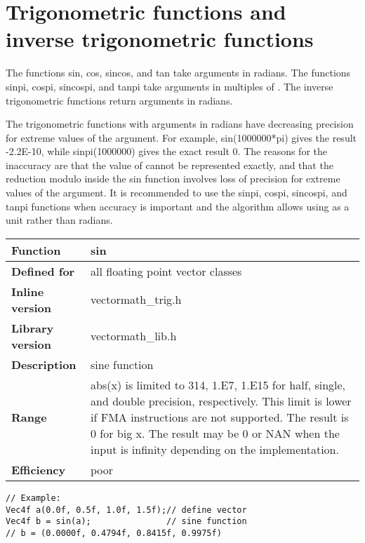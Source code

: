 \documentclass[vcl_manual.tex]{subfiles}
\begin{document}


\section{Trigonometric functions and inverse trigonometric functions}
The functions sin, cos, sincos, and tan take arguments in radians. The functions sinpi, cospi, sincospi, and tanpi take arguments in multiples of \pi{}. The inverse trigonometric functions return arguments in radians.

The trigonometric functions with arguments in radians have decreasing precision for extreme values of the argument. For example, sin(1000000*pi) gives the result -2.2E-10, while sinpi(1000000) gives the exact result 0. The reasons for the inaccuracy are that the value of \pi{} cannot be represented exactly, and that the reduction modulo \pi{} inside the sin function involves loss of precision for extreme values of the argument. It is recommended to use the sinpi, cospi, sincospi, and tanpi functions when accuracy is important and the algorithm allows using \pi{} as a unit rather than radians.

\begin{tabular}{|p{30mm}|p{120mm}|}
\hline
\bfseries Function & sin \\ \hline
\bfseries Defined for & all floating point vector classes \\ \hline
\bfseries Inline version & vectormath\_trig.h \\ \hline
\bfseries Library version & vectormath\_lib.h \\ \hline
\bfseries Description & sine function \\ \hline
\bfseries Range & abs(x) is limited to 314, 1.E7, 1.E15 for half, single, and double precision, respectively. This limit is lower if FMA instructions are not supported. The result is 0 for big x. The result may be 0 or NAN when the input is infinity depending on the implementation. \\ \hline
\bfseries Efficiency & poor \\ \hline
\end{tabular}
\begin{lstlisting}[frame=none]
// Example:
Vec4f a(0.0f, 0.5f, 1.0f, 1.5f);// define vector
Vec4f b = sin(a);               // sine function
// b = (0.0000f, 0.4794f, 0.8415f, 0.9975f)
\end{lstlisting}
\end{document}
